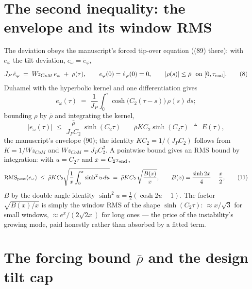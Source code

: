 \documentclass[10pt]{article}
\newcommand{\rbar}{\bar\rho}
\newcommand{\rms}{\mathrm{RMS}}
\newcommand{\Wz}{W\!z_{CoM}}
\begin{document}
\section{The second inequality: the envelope and its window RMS}

The deviation obeys the manuscript's forced tip-over equation
((89) there): with $e_\varphi$ the tilt deviation,
$e_\omega = \dot e_\varphi$,
\begin{equation}
  J_P\,\ddot e_\varphi \;=\; \Wz\, e_\varphi \;+\; \rho(\tau),
  \qquad e_\varphi(0) = \dot e_\varphi(0) = 0,
  \qquad |\rho(s)| \le \rbar \ \ \text{on } [0, \tau_{\rm end}].
  \tag{8}
\end{equation}
Duhamel with the hyperbolic kernel and one differentiation gives
\begin{equation}
  e_\omega(\tau) \;=\; \frac{1}{J_P}\int_0^\tau
  \cosh\big(C_2(\tau - s)\big)\,\rho(s)\,ds ;
  \tag{9}
\end{equation}
bounding $\rho$ by $\rbar$ and integrating the kernel,
\begin{equation}
  |e_\omega(\tau)| \;\le\;
  \frac{\rbar}{J_PC_2}\,\sinh(C_2\tau)
  \;=\; \rbar K C_2 \sinh(C_2\tau)
  \;\triangleq\; E(\tau),
  \tag{10}
\end{equation}
the manuscript's envelope (90); the identity $KC_2 = 1/(J_PC_2)$
follows from $K = 1/\Wz$ and $\Wz = J_PC_2^2$. A pointwise bound
gives an RMS bound by integration: with $u = C_2\tau$ and
$x = C_2\tau_{\rm end}$,
\begin{equation}
  \rms_{\rm post}(e_\omega)
  \;\le\;
  \rbar K C_2
  \sqrt{\frac{1}{x}\int_0^{x}\sinh^2 u \, du}
  \;=\;
  \rbar K C_2\,\sqrt{\frac{B(x)}{x}},
  \qquad
  B(x) = \frac{\sinh 2x}{4} - \frac{x}{2},
  \tag{11}
\end{equation}
$B$ by the double-angle identity
$\sinh^2 u = \tfrac12(\cosh 2u - 1)$. The factor $\sqrt{B(x)/x}$ is
simply the window RMS of the shape $\sinh(C_2\tau)$:
$\approx x/\sqrt3$ for small windows,
$\approx e^{x}/(2\sqrt{2x})$ for long ones --- the price of the
instability's growing mode, paid honestly rather than absorbed by a
fitted term.

\section{The forcing bound $\rbar$ and the design tilt cap}
\end{document}
